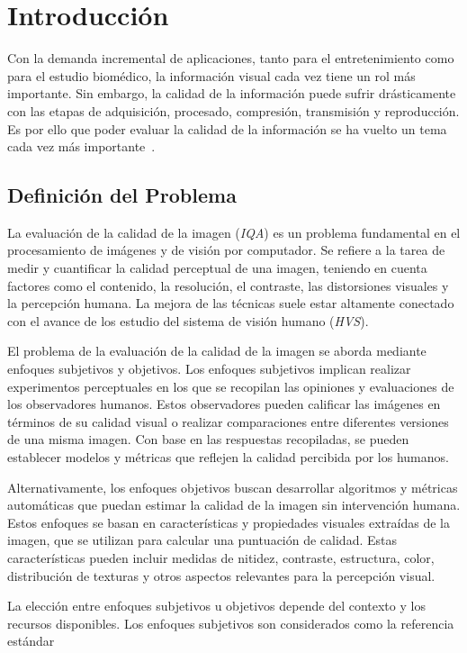 \chapter{Introducción}
Con la demanda incremental de aplicaciones, tanto para el entretenimiento 
como para el estudio biomédico, la información visual cada vez tiene un rol 
más importante. Sin embargo, la calidad de la información puede sufrir drásticamente
con las etapas de adquisición, procesado, compresión, transmisión y reproducción.
Es por ello que poder evaluar la calidad de la información se ha vuelto un 
tema cada vez más importante~\cite{VisualMedicalQualityBook}.
\section{Definición del Problema}   
La evaluación de la calidad de la imagen (\emph{IQA}) es un problema fundamental 
en el procesamiento de imágenes y de visión por computador. Se refiere a la 
tarea de medir y cuantificar la calidad perceptual de una imagen, 
teniendo en cuenta factores como el contenido, la resolución, el contraste, 
las distorsiones visuales y la percepción humana. 
La mejora de las técnicas suele estar altamente conectado con el avance 
de los estudio del sistema de visión humano (\emph{HVS})\cite{Wang2006ModernIQ}.
\par 
El problema de la evaluación de la calidad de la imagen se aborda mediante enfoques 
subjetivos y objetivos. Los enfoques subjetivos implican realizar experimentos 
perceptuales en los que se recopilan las opiniones y evaluaciones de los observadores 
humanos. Estos observadores pueden calificar las imágenes en términos de su 
calidad visual o realizar comparaciones entre diferentes versiones de una misma imagen. 
Con base en las respuestas recopiladas, se pueden establecer modelos y 
métricas que reflejen la calidad percibida por los humanos.
\par
Alternativamente, los enfoques objetivos buscan desarrollar algoritmos y métricas 
automáticas que puedan estimar la calidad de la imagen sin intervención humana. 
Estos enfoques se basan en características y propiedades visuales extraídas de la 
imagen, que se utilizan para calcular una puntuación de calidad. Estas características 
pueden incluir medidas de nitidez, contraste, estructura, color, distribución de 
texturas y otros aspectos relevantes para la percepción visual.
\par 
La elección entre enfoques subjetivos u objetivos depende del contexto y los 
recursos disponibles. Los enfoques subjetivos son considerados como la referencia estándar 
